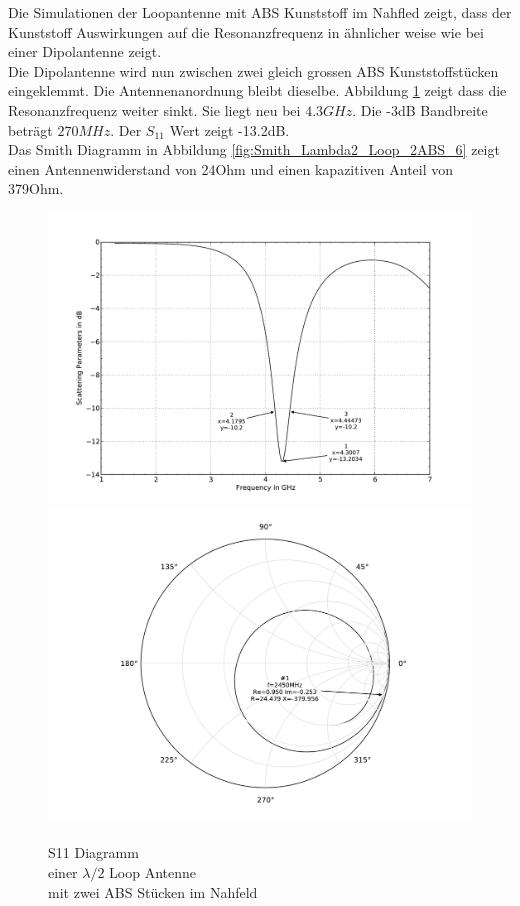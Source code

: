 Die Simulationen der Loopantenne mit ABS Kunststoff im Nahfled  zeigt, dass der Kunststoff  Auswirkungen auf die Resonanzfrequenz in ähnlicher weise wie bei einer Dipolantenne zeigt.\\
Die Dipolantenne wird nun zwischen zwei gleich grossen ABS Kunststoffstücken eingeklemmt. Die Antennenanordnung bleibt dieselbe. Abbildung \ref{fig:S11_Lambda2_Loop_2ABS_5} zeigt dass die Resonanzfrequenz weiter sinkt. Sie liegt neu bei $4.3GHz$. Die -3dB Bandbreite beträgt $270MHz$. Der $S_{11}$ Wert zeigt -13.2dB.\\
Das Smith Diagramm in Abbildung \ref{fig:Smith_Lambda2_Loop_2ABS_6} zeigt einen Antennenwiderstand von 24Ohm und einen kapazitiven Anteil von 379Ohm.

\begin{figure}[!h]
	\begin{center}
 	\includegraphics[width=\linewidth]{content/bilder/Evaluation/Loop/L2/2ABS/S11_Loop_Lambda2_mit2ABS.pdf}
  	\caption{\\S11 Diagramm \\einer $\lambda/2$ Loop Antenne \\mit zwei ABS Stücken im Nahfeld}				\label{fig:S11_Lambda2_Loop_2ABS_5}
\endminipage%
 	\includegraphics[width=\linewidth]{content/bilder/Evaluation/Loop/L2/2ABS/Smith_Loop_Lambda2_mit2ABS.pdf}

\end{center}
\end{figure}
